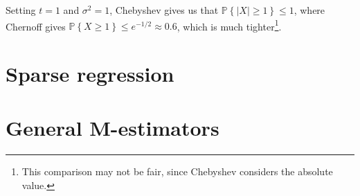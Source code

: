 \documentclass{article}
\newcommand{\prob}[1]{\mathbb{P}\left\{#1\right\}}
\begin{document}
Setting $t = 1$ and $\sigma^2 = 1$, Chebyshev gives us that $\prob{|X| \geq 1}
\leq 1$, where Chernoff gives $\prob{X \geq 1} \leq e^{-1/2} \approx 0.6$, which
is much tighter\footnote{This comparison may not be fair, since Chebyshev
considers the absolute value.}.

\section{Sparse regression}

\section{General M-estimators}
\end{document}
